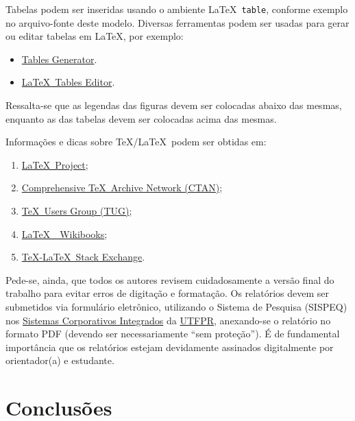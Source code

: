 \documentclass[%
  a4paper,%
  12pt,%
  fleqn,%
  english,%
  brazilian,%
]{article}
\begin{document}
Tabelas podem ser inseridas usando o ambiente \LaTeX\ \texttt{table}, conforme exemplo no arquivo-fonte deste modelo.
Diversas ferramentas podem ser usadas para gerar ou editar tabelas em \LaTeX, por exemplo:

\begin{itemize}
\item \href{https://www.tablesgenerator.com/}{Tables Generator\LinkIcon}.
\item \href{https://www.latex-tables.com/}{\LaTeX\ Tables Editor\LinkIcon}.
\end{itemize}

Ressalta-se que as legendas das figuras devem ser colocadas abaixo das mesmas, enquanto as das tabelas devem ser colocadas acima das mesmas.

Informações e dicas sobre \TeX/\LaTeX\ podem ser obtidas em:

\begin{enumerate}[label = {\alphsect}]
\item \href{https://www.latex-project.org/}{\LaTeX\ Project\LinkIcon};
\item \href{https://www.ctan.org/}{Comprehensive \TeX\ Archive Network (CTAN)\LinkIcon};
\item \href{https://www.tug.org/}{\TeX\ Users Group (TUG)\LinkIcon};
\item \href{https://en.wikibooks.org/wiki/LaTeX/}{\LaTeX\ \textemdash\ Wikibooks\LinkIcon};
\item \href{https://tex.stackexchange.com/}{\TeX-\LaTeX\ Stack Exchange\LinkIcon}.
\end{enumerate}

Pede-se, ainda, que todos os autores revisem cuidadosamente a versão final do trabalho para evitar erros de digitação e formatação.
Os relatórios devem ser submetidos via formulário eletrônico, utilizando o Sistema de Pesquisa (SISPEQ) nos \href{https://sistemas2.utfpr.edu.br/}{Sistemas Corporativos Integrados\LinkIcon} da \href{https://www.utfpr.edu.br/}{UTFPR\LinkIcon}, anexando-se o relatório no formato PDF (devendo ser necessariamente \enquote{sem proteção}).
É de fundamental importância que os relatórios estejam devidamente assinados digitalmente por orientador{(a)} e estudante.

\section{Conclusões}%
\label{sect:concl}
\end{document}
